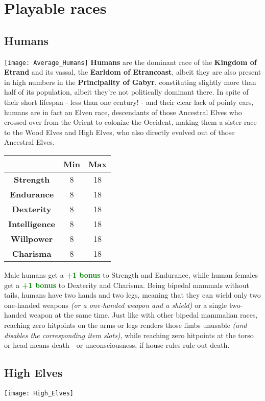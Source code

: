 \documentclass[openany,11pt,a4paper]{book}
\begin{document}
\chapter{Playable races}
\section{Humans}
\texttt{[image: Average\_Humans]}\newline
\textbf{Humans} are the dominant race of the \textbf{Kingdom of Etrand} and its vassal, the \textbf{Earldom of Etrancoast}, albeit they are also present in high numbers in the \textbf{Principality of Gabyr}, constituting slightly more than half of its population, albeit they're not politically dominant there. In spite of their short lifespan - less than one century! - and their clear lack of pointy ears, humans are in fact an Elven race, descendants of those Ancestral Elves who crossed over from the Orient to colonize the Occident, making them a sister-race to the Wood Elves and High Elves, who also directly evolved out of those Ancestral Elves.\newline
\begin{tabular}{|c|c|c|}
\hline
 & \textbf{Min} & \textbf{Max} \\ \hline
\textbf{Strength} & 8 & 18 \\ \hline
\textbf{Endurance} & 8 & 18 \\ \hline
\textbf{Dexterity} & 8 & 18 \\ \hline
\textbf{Intelligence} & 8 & 18 \\ \hline
\textbf{Willpower} & 8 & 18 \\ \hline
\textbf{Charisma} & 8 & 18 \\ \hline
\end{tabular}\newline
Male humans get a \textcolor{green}{\textbf{+1 bonus}} to Strength and Endurance, while human females get a \textcolor{green}{\textbf{+1 bonus}} to Dexterity and Charisma. Being bipedal mammals without tails, humans have two hands and two legs, meaning that they can wield only two one-handed weapons \textit{(or a one-handed weapon and a shield)} or a single two-handed weapon at the same time. Just like with other bipedal mammalian races, reaching zero hitpoints on the arms or legs renders those limbs unusable \textit{(and disables the corresponding item slots)}, while reaching zero hitpoints at the torso or head means death - or unconsciousness, if house rules rule out death.
\section{High Elves}
\texttt{[image: High\_Elves]}
\end{document}
